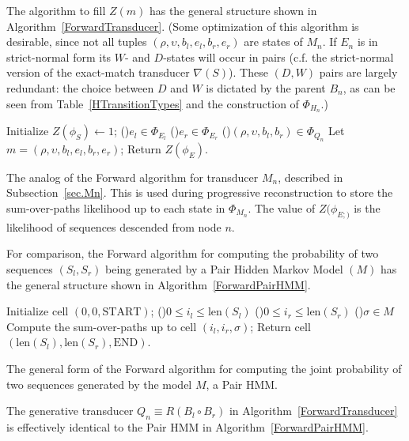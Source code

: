 \documentclass{article}
\newcommand{\secref}[1]{Subsection~\ref{sec.#1}}
\newcommand\compose{}
\newcommand\fork{\circ}
\newcommand\recognize{\nabla}
\newcommand\States{\Phi}
\newcommand\statesof[1]{\States_{#1}}
\newcommand\startstate{\phi_S}
\newcommand\laststate{\phi_E}
\newcommand\laststateof[1]{\phi_{E;#1}}
\newcommand\seqlen[1]{\mbox{len}(#1)}
\newcommand\mstate{(\rho,\upsilon,b_l,e_l,b_r,e_r)}
\newcommand\qstate{(\rho,\upsilon,b_l,b_r)}
\begin{document}
The algorithm to fill $Z(m)$ has the general structure shown in Algorithm~\ref{ForwardTransducer}.
(Some optimization of this algorithm is desirable, since not all tuples $\mstate$ are states of $M_n$.
If $E_n$ is in strict-normal form its $W$- and $D$-states will occur in pairs
(c.f. the strict-normal version of the exact-match transducer $\recognize(S)$).
These $(D,W)$ pairs are largely redundant: the choice between $D$ and $W$ is dictated by the parent $B_n$,
as can be seen from Table~\ref{HTransitionTypes} and the construction of $\statesof{H_n}$.)

\begin{algorithm}
  Initialize $Z(\startstate) \leftarrow 1$;
  \BlankLine
  \ForEach(){$e_l \in \statesof{E_l}$} {
    \ForEach(){$e_r \in \statesof{E_r}$} {
      \ForEach(){$\qstate \in \statesof{Q_n}$} {
        Let $m = \mstate$;
        \BlankLine
        \If{$m \in \statesof{M_n}$}{
          Compute $Z(m)$;
        }
      }
    }
  }
  Return $Z(\laststate)$.
\caption{\label{ForwardTransducer}
The analog of the Forward algorithm for transducer $M_n$, described in \secref{Mn}. This is used during progressive reconstruction to store the sum-over-paths likelihood up to each state in $\statesof{M_n}$.  The value of $Z(\laststateof)$ is the likelihood of sequences descended from node $n$. 
}
\end{algorithm}

For comparison, the Forward algorithm for computing the probability of two sequences $(S_l,S_r)$
being generated by a Pair Hidden Markov Model $(M)$ has the general structure shown in Algorithm~\ref{ForwardPairHMM}.

\begin{algorithm}
  Initialize cell $(0,0,\mbox{START})$;
  \BlankLine
  \ForEach(){$0 \leq i_l \leq \seqlen{S_l}$} {
    \ForEach(){$0 \leq i_r \leq \seqlen{S_r}$} {
      \ForEach(){$\sigma \in M$} {
        Compute the sum-over-paths up to cell $(i_l,i_r,\sigma)$;
      }
    }
  }
  Return cell $(\seqlen{S_l},\seqlen{S_r},\mbox{END})$.
\caption{\label{ForwardPairHMM}
The general form of the Forward algorithm for computing the joint probability of two sequences generated by the model $M$, a  Pair HMM.  
}
\end{algorithm}

The generative transducer $Q_n \equiv R \compose (B_l \fork B_r)$
in Algorithm~\ref{ForwardTransducer} is effectively identical to the Pair HMM in Algorithm~\ref{ForwardPairHMM}.
\end{document}
